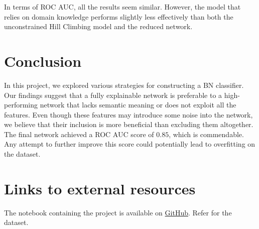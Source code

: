\documentclass[letterpaper]{article}
\begin{document}
In terms of ROC AUC, all the results seem similar. However, the model that relies on domain knowledge performs slightly less effectively than both the unconstrained Hill Climbing model and the reduced network.

\section{Conclusion}
In this project, we explored various strategies for constructing a BN classifier. Our findings suggest that a fully explainable network is preferable to a high-performing network that lacks semantic meaning or does not exploit all the features. Even though these features may introduce some noise into the network, we believe that their inclusion is more beneficial than excluding them altogether. The final network achieved a ROC AUC score of $0.85$, which is commendable. Any attempt to further improve this score could potentially lead to overfitting on the dataset.

\section{Links to external resources}
The notebook containing the project is available on \href{https://github.com/MatteoFasulo/BayesianHeartDisease}{GitHub}. Refer \cite{dataset} for the dataset.
\bigskip





\end{document}
